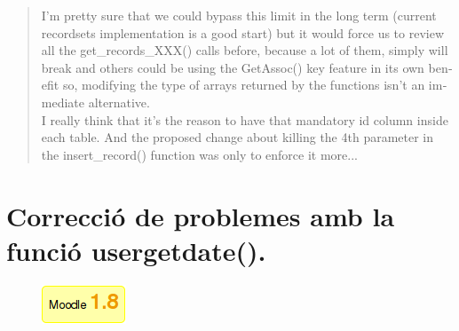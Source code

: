 \documentclass[a4paper]{report}  %
\begin{document}
\begin{otherlanguage}{english}
\begin{quote}
I'm pretty sure that we could bypass this limit in the long term (current recordsets implementation is a good start) but it would force us to review all the get\_records\_XXX() calls before, because a lot of them, simply will break and others could be using the GetAssoc() key feature in its own benefit so, modifying the type of arrays returned by the functions isn't an immediate alternative.\\
I really think that it's the reason to have that mandatory id column inside each table. And the proposed change about killing the 4th parameter in the insert\_record() function was only to enforce it more...\\
\end{quote}
\end{otherlanguage}

\section{Correcció de problemes amb la funció usergetdate().}\label{annexfunciotime}
\begin{minipage}{10cm}
\end{minipage}
\hfill
\begin{minipage}{2.51cm}
		\begin{figure}[H] %
		\begin{center}
		\includegraphics[width=2.51cm]{img/Moodle18.png}
		\label{fig:Moodle18}
		\end{center}
		\end{figure}
\end{minipage}		
\\
\end{document}
